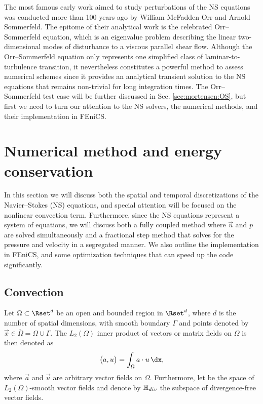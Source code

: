 The most famous early work aimed to study perturbations of the NS
equations was conducted more than 100 years ago by William McFadden
Orr and Arnold Sommerfeld. The epitome of their analytical work is the
celebrated Orr--Sommerfeld equation, which is an eigenvalue problem
describing the linear two-dimensional modes of disturbance to a
viscous parallel shear flow. Although the Orr--Sommerfeld equation only
represents one simplified class of laminar-to-turbulence transition,
it nevertheless constitutes a powerful method to assess numerical
schemes since it provides an analytical transient solution to the NS
equations that remains non-trivial for long integration times. The
Orr--Sommerfeld test case will be further discussed in
Sec. \ref{sec:mortensen:OS}, but first we need to turn our attention
to the NS solvers, the numerical methods, and their implementation in
FEniCS.

\section{Numerical method and energy conservation}
\label{sec:mortensen:Numerical}

In this section we will discuss both the spatial and temporal
discretizations of the Navier--Stokes (NS) equations, and special
attention will be focused on the nonlinear convection
term. Furthermore, since the NS equations represent a system of
equations, we will discuss both a fully coupled method where $\vec{u}$
and $p$ are solved simultaneously and a fractional step method that
solves for the pressure and velocity in a segregated manner. We also
outline the implementation in FEniCS, and some optimization techniques
that can speed up the code significantly.

\subsection{Convection}
\label{sec:mortensen:Convection}

Let $\Omega \subset \Rset^d$ be an open and bounded region in
$\Rset^d$, where $d$ is the number of spatial dimensions, with smooth
boundary $\Gamma$ and points denoted by $\vec{x}\in
\overline{\Omega}=\Omega \cup \Gamma$. The $L_2(\Omega)$ inner product
of vectors or matrix fields on $\Omega$ is then denoted as
\begin{equation}
 \bigl( \vec{a},\vec{u} \bigr) = \int_{\Omega} \vec{a}\cdot \vec{u}\, \dx,
 \label{eq:mortensen:L2}
\end{equation}
where $\vec{a}$ and $\vec{u}$ are arbitrary vector fields on
$\Omega$. Furthermore, let \Hset be the space of $L_2(\Omega)$-smooth
vector fields and denote by $\mathbb{H}_{div}$ the subspace of
divergence-free vector fields.

